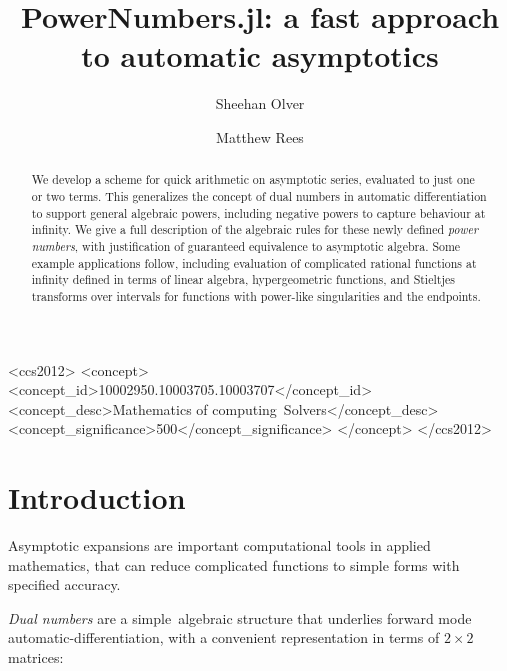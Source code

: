 \documentclass[acmsmall]{acmart}
\begin{document}
	
\title{PowerNumbers.jl: a fast approach to automatic asymptotics}

\author{Sheehan Olver}

\author{Matthew Rees}

\begin{abstract}
	We develop a scheme for quick arithmetic on asymptotic series, evaluated to just one or two terms. This generalizes the concept of dual numbers in automatic differentiation to support general algebraic powers, including negative powers to capture behaviour at infinity.  We give a full description of the algebraic rules for these newly defined {\it power numbers}, with justification of guaranteed equivalence to asymptotic algebra. Some example applications follow, including evaluation of complicated rational functions at infinity defined in terms of linear algebra, hypergeometric functions, and Stieltjes transforms over intervals for functions with power-like singularities and the endpoints.
\end{abstract}

\begin{CCSXML}
	<ccs2012>
	<concept>
	<concept_id>10002950.10003705.10003707</concept_id>
	<concept_desc>Mathematics of computing~Solvers</concept_desc>
	<concept_significance>500</concept_significance>
	</concept>
	</ccs2012>
\end{CCSXML}



\maketitle

\section{Introduction}

Asymptotic expansions are important computational tools in applied mathematics, that can reduce complicated functions to simple forms with specified accuracy. 


{\it Dual numbers} are a simple algebraic structure that underlies forward mode automatic-differentiation, with a convenient representation in terms of $2 \times 2$ matrices:
\end{document}
